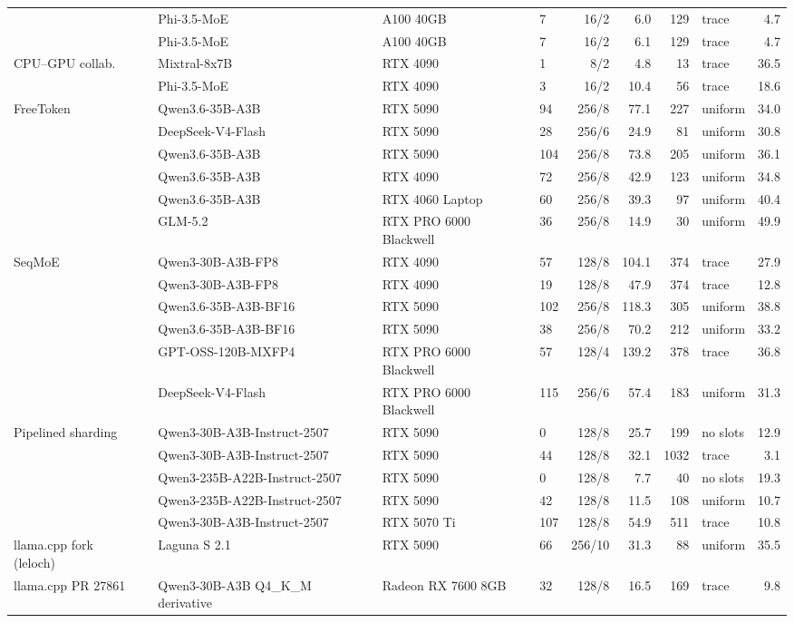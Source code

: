 \begin{footnotesize}
\begin{longtable}{@{}p{}p{}p{}lrrrlr@{}}
 & Phi-3.5-MoE & A100 40GB & 7 & 16/2 & 6.0 & 129 & trace & 4.7 \\
 & Phi-3.5-MoE & A100 40GB & 7 & 16/2 & 6.1 & 129 & trace & 4.7 \\
CPU--GPU collab.~\cite{huang2025cpugpu} & Mixtral-8x7B & RTX 4090 & 1 & 8/2 & 4.8 & 13 & trace & 36.5 \\
 & Phi-3.5-MoE & RTX 4090 & 3 & 16/2 & 10.4 & 56 & trace & 18.6 \\
FreeToken~\cite{freetoken} & Qwen3.6-35B-A3B & RTX 5090 & 94 & 256/8 & 77.1 & 227 & uniform & 34.0 \\
 & DeepSeek-V4-Flash & RTX 5090 & 28 & 256/6 & 24.9 & 81 & uniform & 30.8 \\
 & Qwen3.6-35B-A3B & RTX 5090 & 104 & 256/8 & 73.8 & 205 & uniform & 36.1 \\
 & Qwen3.6-35B-A3B & RTX 4090 & 72 & 256/8 & 42.9 & 123 & uniform & 34.8 \\
 & Qwen3.6-35B-A3B & RTX 4060 Laptop & 60 & 256/8 & 39.3 & 97 & uniform & 40.4 \\
 & GLM-5.2 & RTX PRO 6000 Blackwell & 36 & 256/8 & 14.9 & 30 & uniform & 49.9 \\
SeqMoE~\cite{wang2026seqmoe} & Qwen3-30B-A3B-FP8 & RTX 4090 & 57 & 128/8 & 104.1 & 374 & trace & 27.9 \\
 & Qwen3-30B-A3B-FP8 & RTX 4090 & 19 & 128/8 & 47.9 & 374 & trace & 12.8 \\
 & Qwen3.6-35B-A3B-BF16 & RTX 5090 & 102 & 256/8 & 118.3 & 305 & uniform & 38.8 \\
 & Qwen3.6-35B-A3B-BF16 & RTX 5090 & 38 & 256/8 & 70.2 & 212 & uniform & 33.2 \\
 & GPT-OSS-120B-MXFP4 & RTX PRO 6000 Blackwell & 57 & 128/4 & 139.2 & 378 & trace & 36.8 \\
 & DeepSeek-V4-Flash & RTX PRO 6000 Blackwell & 115 & 256/6 & 57.4 & 183 & uniform & 31.3 \\
Pipelined sharding~\cite{pipelinedsharding2026} & Qwen3-30B-A3B-Instruct-2507 & RTX 5090 & 0 & 128/8 & 25.7 & 199 & no slots & 12.9 \\
 & Qwen3-30B-A3B-Instruct-2507 & RTX 5090 & 44 & 128/8 & 32.1 & 1032 & trace & 3.1 \\
 & Qwen3-235B-A22B-Instruct-2507 & RTX 5090 & 0 & 128/8 & 7.7 & 40 & no slots & 19.3 \\
 & Qwen3-235B-A22B-Instruct-2507 & RTX 5090 & 42 & 128/8 & 11.5 & 108 & uniform & 10.7 \\
 & Qwen3-30B-A3B-Instruct-2507 & RTX 5070 Ti & 107 & 128/8 & 54.9 & 511 & trace & 10.8 \\
llama.cpp fork (leloch)~\cite{leloch2026} & Laguna S 2.1 & RTX 5090 & 66 & 256/10 & 31.3 & 88 & uniform & 35.5 \\
llama.cpp PR 27861~\cite{llamacpppr27861} & Qwen3-30B-A3B Q4\_K\_M derivative & Radeon RX 7600 8GB & 32 & 128/8 & 16.5 & 169 & trace & 9.8 \\
\end{longtable}
\end{footnotesize}
